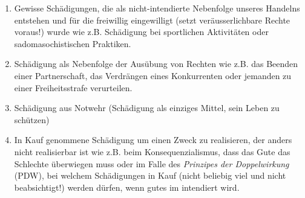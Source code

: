 \documentclass[../main.tex]{subfiles}
\begin{document}
\begin{enumerate}[label=(\alph*)]
	\item Gewisse Schädigungen, die als nicht-intendierte Nebenfolge unseres Handelns entstehen und für die freiwillig eingewilligt (setzt veräusserlichbare Rechte voraus!) wurde wie z.B. Schädigung bei sportlichen Aktivitäten oder sadomasochistischen Praktiken.  
	\item Schädigung als Nebenfolge der Ausübung von Rechten wie z.B. das Beenden einer Partnerschaft, das Verdrängen eines Konkurrenten oder jemanden zu einer Freiheitsstrafe verurteilen.
	\item Schädigung aus Notwehr (Schädigung als einziges Mittel, sein Leben zu schützen)
	\item In Kauf genommene Schädigung um einen Zweck zu realisieren, der anders nicht realisierbar ist wie z.B. beim Konsequenzialismus, dass das Gute das Schlechte überwiegen muss oder im Falle des \textit{Prinzipes der Doppelwirkung} (PDW), bei welchem Schädigungen in Kauf (nicht beliebig viel und nicht beabsichtigt!) werden dürfen, wenn gutes im intendiert wird.  
\end{enumerate}
\end{document}
